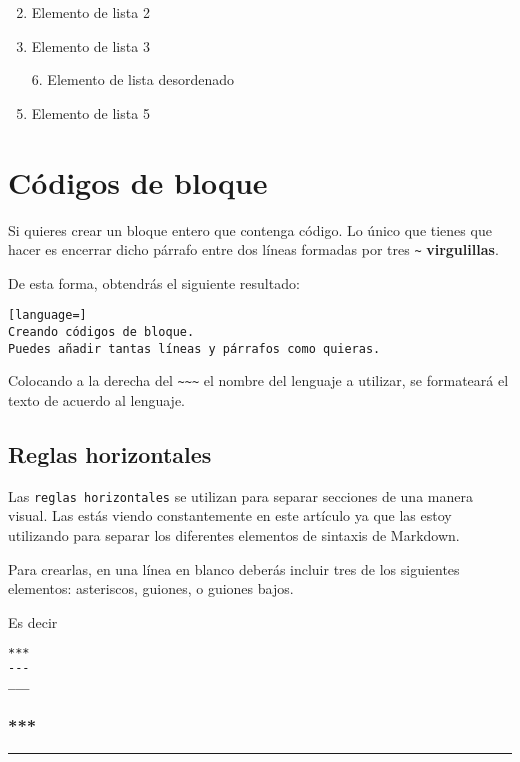 \begin{enumerate}
\setcounter{enumi}{1}
\item Elemento de lista 2
\item  Elemento de lista 3
\item[6.] Elemento de lista desordenado
\item Elemento de lista 5
\end{enumerate}

\chapter{Códigos de bloque}

Si quieres crear un bloque entero que contenga código. Lo único que tienes que hacer es encerrar dicho párrafo entre dos líneas formadas por tres \lstinline{~} \textbf{virgulillas}.

De esta forma, obtendrás el siguiente resultado:

\begin{lstlisting}[language=]
Creando códigos de bloque.
Puedes añadir tantas líneas y párrafos como quieras.  
\end{lstlisting}

Colocando a la derecha del \lstinline{~~~} el nombre del lenguaje a utilizar, se formateará el texto de acuerdo al lenguaje.

\section{Reglas horizontales}

Las \lstinline{reglas horizontales} se utilizan para separar secciones de una manera visual. Las estás viendo constantemente en este artículo ya que las estoy utilizando para separar los diferentes elementos de sintaxis de Markdown.

Para crearlas, en una línea en blanco deberás incluir tres de los siguientes elementos: asteriscos, guiones, o guiones bajos.

Es decir

\begin{lstlisting}[language= md]
***
---
___
\end{lstlisting}

\subsection{***}
\par\noindent\rule{\textwidth}{0.4pt}

